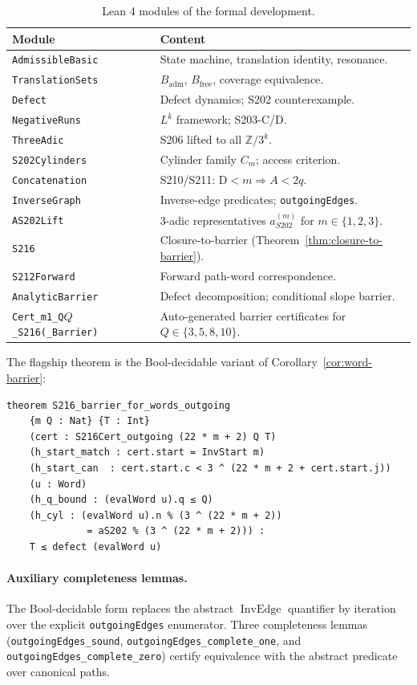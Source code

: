 \documentclass[11pt,a4paper]{article}
\theoremstyle{plain}
\theoremstyle{definition}
\newcommand{\ZZ}{\mathbb{Z}}
\newcommand{\aSat}{a_{S202}^{(m)}}
\newcommand{\defect}{\mathrm{D}}
\DeclareMathOperator{\InvEdge}{InvEdge}
\begin{document}
\begin{table}[h]
\centering
\caption{Lean 4 modules of the formal development.}
\label{tab:modules}
\begin{tabular}{ll}
\toprule
Module & Content \\
\midrule
\texttt{AdmissibleBasic} & State machine, translation identity, resonance.\\
\texttt{TranslationSets} & $B_{\mathrm{adm}}$, $B_{\mathrm{free}}$, coverage equivalence.\\
\texttt{Defect} & Defect dynamics; S202 counterexample.\\
\texttt{NegativeRuns} & $L^k$ framework; S203-C/D.\\
\texttt{ThreeAdic} & S206 lifted to all $\ZZ / 3^k$.\\
\texttt{S202Cylinders} & Cylinder family $C_m$; access criterion.\\
\texttt{Concatenation} & S210/S211: $\defect < m \Rightarrow A < 2q$.\\
\texttt{InverseGraph} & Inverse-edge predicates; \texttt{outgoingEdges}.\\
\texttt{AS202Lift} & 3-adic representatives $\aSat$ for $m \in \{1,2,3\}$.\\
\texttt{S216} & Closure-to-barrier (Theorem~\ref{thm:closure-to-barrier}).\\
\texttt{S212Forward} & Forward path-word correspondence.\\
\texttt{AnalyticBarrier} & Defect decomposition; conditional slope barrier.\\
\texttt{Cert\_m1\_Q$Q$\_S216(\_Barrier)} & Auto-generated barrier certificates for $Q \in \{3,5,8,10\}$.\\
\bottomrule
\end{tabular}
\end{table}

The flagship theorem is the Bool-decidable variant of
Corollary~\ref{cor:word-barrier}:

\begin{lstlisting}
theorem S216_barrier_for_words_outgoing
    {m Q : Nat} {T : Int}
    (cert : S216Cert_outgoing (22 * m + 2) Q T)
    (h_start_match : cert.start = InvStart m)
    (h_start_can  : cert.start.c < 3 ^ (22 * m + 2 + cert.start.j))
    (u : Word)
    (h_q_bound : (evalWord u).q ≤ Q)
    (h_cyl : (evalWord u).n % (3 ^ (22 * m + 2))
              = aS202 % (3 ^ (22 * m + 2))) :
    T ≤ defect (evalWord u)
\end{lstlisting}

\paragraph{Auxiliary completeness lemmas.} The Bool-decidable form
replaces the abstract $\InvEdge$ quantifier by iteration over the
explicit \texttt{outgoingEdges} enumerator. Three completeness lemmas
(\texttt{outgoingEdges\_sound}, \texttt{outgoingEdges\_complete\_one},
and \texttt{outgoingEdges\_complete\_zero}) certify equivalence with
the abstract predicate over canonical paths.
\end{document}
